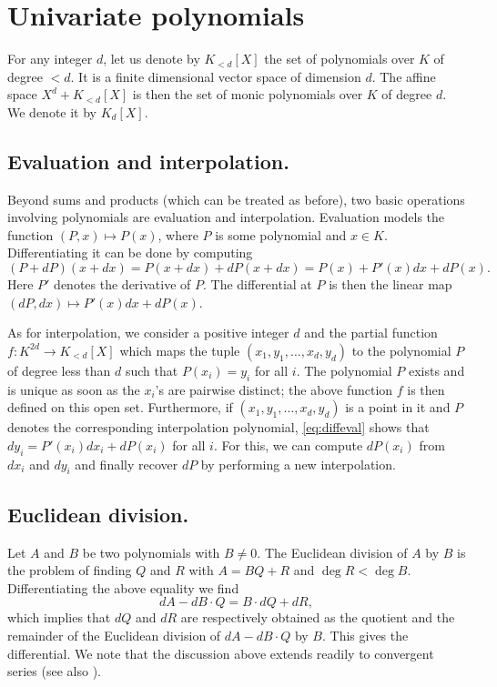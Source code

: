 \documentclass{sig-alternate}
\begin{document}
{\section{Univariate polynomials}
\label{sec:polynomials}

For any integer $d$, let us denote by $K_{< d}[X]$ the set of 
polynomials over $K$ of degree $< d$. It is a finite dimensional vector 
space of dimension $d$. The affine space $X^d + K_{< d}[X]$ is then 
the set of monic polynomials over $K$ of degree $d$. We denote it by 
$K_d[X]$.

\subsection*{Evaluation and interpolation.}

Beyond sums and products (which can be treated as before), two basic 
operations involving polynomials are evaluation and interpolation.
Evaluation models the function $(P,x) \mapsto P(x)$, where
$P$ is some polynomial and $x \in K$. Differentiating
it can be done by computing
\begin{equation}
\label{eq:diffeval}
(P + dP)(x + dx) = P(x + dx) + dP(x + dx) = P(x) + P'(x) dx + dP(x).
\end{equation}
Here $P'$ denotes the derivative of 
$P$. The differential at $P$ is then the linear map $(dP, dx) \mapsto 
P'(x) dx + dP(x)$.

As for interpolation, we consider a positive integer $d$ and the partial 
function $f : K^{2d} \to K_{< d}[X]$ which maps the tuple $(x_1, y_1, 
\ldots, x_d, y_d)$ to the polynomial $P$ of degree less than $d$ such 
that $P(x_i) = y_i$ for all $i$. The polynomial $P$ exists and is unique 
as soon as the $x_i$'s are pairwise distinct; the above function $f$ is 
then defined on this open set. Furthermore, if $(x_1, y_1, \ldots, x_d, 
y_d)$ is a point in it and $P$ denotes the corresponding interpolation 
polynomial, \eqref{eq:diffeval} shows that $d y_i = P'(x_i) dx_i + 
dP(x_i)$ for all $i$. For this, we can compute $dP(x_i)$ from $d x_i$ 
and $d y_i$ and finally recover $dP$ by performing a new interpolation.

\subsection*{Euclidean division.}

Let $A$ and $B$ be two polynomials with $B \neq 0$. The Euclidean division of 
$A$ by $B$ is the problem of finding $Q$ and $R$ with $A = BQ + R$ and $\deg R < \deg B$. 
Differentiating the above equality we find
\[
dA - dB \cdot Q = B \cdot dQ + dR,
\]
which implies that $dQ$ and $dR$ are respectively obtained as the 
quotient and the remainder of the Euclidean division of $dA - dB \cdot 
Q$ by $B$. This gives the differential. We note that the discussion 
above extends readily to convergent series (see also 
\cite{caruso-lubicz:14a}).

}
\end{document}

